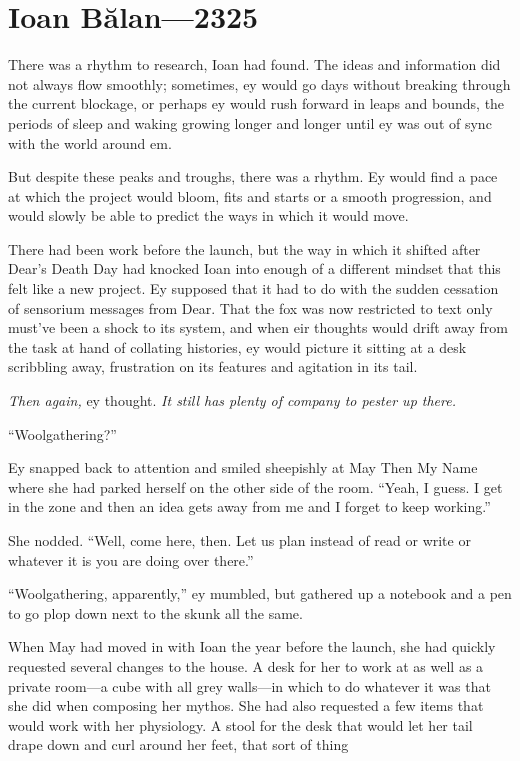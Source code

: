 \hypertarget{ioan-bux103lan—2325}{%
\chapter{Ioan Bălan—2325}\label{ioan-bux103lan—2325}}

There was a rhythm to research, Ioan had found. The ideas and information did not always flow smoothly; sometimes, ey would go days without breaking through the current blockage, or perhaps ey would rush forward in leaps and bounds, the periods of sleep and waking growing longer and longer until ey was out of sync with the world around em.

But despite these peaks and troughs, there was a rhythm. Ey would find a pace at which the project would bloom, fits and starts or a smooth progression, and would slowly be able to predict the ways in which it would move.

There had been work before the launch, but the way in which it shifted after Dear's Death Day had knocked Ioan into enough of a different mindset that this felt like a new project. Ey supposed that it had to do with the sudden cessation of sensorium messages from Dear. That the fox was now restricted to text only must've been a shock to its system, and when eir thoughts would drift away from the task at hand of collating histories, ey would picture it sitting at a desk scribbling away, frustration on its features and agitation in its tail.

\emph{Then again,} ey thought. \emph{It still has plenty of company to pester up there.}

``Woolgathering?''

Ey snapped back to attention and smiled sheepishly at May Then My Name where she had parked herself on the other side of the room. ``Yeah, I guess. I get in the zone and then an idea gets away from me and I forget to keep working.''

She nodded. ``Well, come here, then. Let us plan instead of read or write or whatever it is you are doing over there.''

``Woolgathering, apparently,'' ey mumbled, but gathered up a notebook and a pen to go plop down next to the skunk all the same.

When May had moved in with Ioan the year before the launch, she had quickly requested several changes to the house. A desk for her to work at as well as a private room---a cube with all grey walls---in which to do whatever it was that she did when composing her mythos. She had also requested a few items that would work with her physiology. A stool for the desk that would let her tail drape down and curl around her feet, that sort of thing

